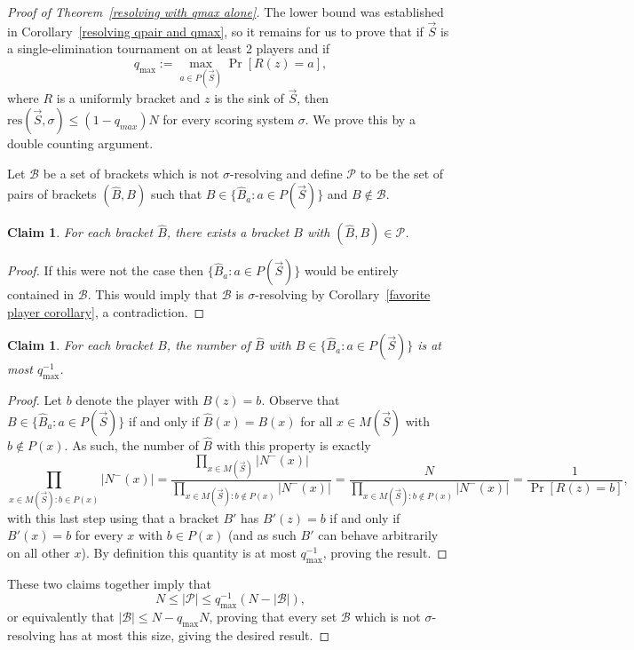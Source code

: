 \documentclass[12pt,letterpaper]{article}
\newtheorem{claim}[thm]{Claim}
\theoremstyle{definition}
\newcommand{\sig}{\sigma}
\renewcommand{\1}{\mathbbm{1}}
\renewcommand{\c}[1]{\mathcal{#1}}
\newcommand{\tour}{\vec{S}}
\newcommand{\res}{\mathrm{res}}
\begin{document}
\begin{proof}[Proof of Theorem~\ref{resolving with qmax alone}]
	The lower bound was established in Corollary~\ref{resolving qpair and qmax}, so  it remains for us to prove that if $\tour$ is a single-elimination tournament on at least 2 players and if 
	\[q_{\max}:=\max_{a\in P(\tour)} \Pr[R(z)=a],\]
	where $R$ is a uniformly bracket and $z$ is the sink of $\tour$, then $\res(\tour,\sig)\le (1-q_{max}) N$ for every scoring system $\sig$.  We prove this by a double counting argument.
	
	Let $\c{B}$ be a set of brackets which is not $\sig$-resolving and define $\c{P}$ to be the set of pairs of brackets $(\widehat{B},B)$ such that $B\in \{\widehat{B}_a:a\in P(\tour)\}$ and $B\notin \c{B}$.
	\begin{claim}
		For each bracket $\widehat{B}$, there exists a bracket $B$ with $(\widehat{B},B)\in \c{P}$.
	\end{claim}
	\begin{proof}
		If this were not the case then  $\{\widehat{B}_a:a\in P(\tour)\}$ would be entirely contained in $\c{B}$. This would imply that $\c{B}$ is $\sig$-resolving by Corollary~\ref{favorite player corollary}, a contradiction.
	\end{proof}
	\begin{claim}
		For each bracket $B$, the number of $\widehat{B}$ with $B\in\{\widehat{B}_a:a\in P(\tour)\}$ is at most $q_{\max}^{-1}$.
	\end{claim}
	\begin{proof}
		Let $b$ denote the player with $B(z)=b$.  Observe that $B\in \{\widehat{B}_a:a\in P(\tour)\}$ if and only if $\widehat{B}(x)=B(x)$ for all $x\in M(\tour)$ with $b\notin P(x)$.  As such, the number of $\widehat{B}$ with this property is exactly
		\[\prod_{x\in M(\tour): b\in P(x)} |N^-(x)|=\frac{\prod_{x\in M(\tour)} |N^-(x)|}{\prod_{x\in M(\tour): b\notin P(x)} |N^-(x)|}=\frac{N}{\prod_{x\in M(\tour): b\notin P(x)} |N^-(x)|}=\frac{1}{\Pr[R(z)=b]},\]
		with this last step using that a bracket $B'$ has $B'(z)=b$ if and only if $B'(x)=b$ for every $x$ with $b\in P(x)$ (and as such $B'$ can behave arbitrarily on all other $x$).  By definition this quantity is at most $q_{\max}^{-1}$, proving the result.
	\end{proof}
	These two claims together imply that
	\[N\le|\c{P}|\le q_{\max}^{-1} (N-|\c{B}|),\]
	or equivalently that $|\c{B}|\le N- q_{\max} N$, proving that every set $\c{B}$ which is not $\sig$-resolving has at most this size, giving the desired result.
\end{proof}
\end{document}
